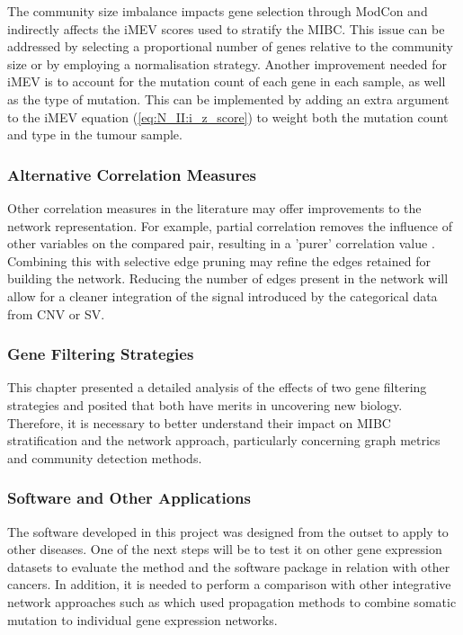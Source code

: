 The community size imbalance impacts gene selection through ModCon and indirectly affects the iMEV scores used to stratify the MIBC. This issue can be addressed by selecting a proportional number of genes relative to the community size or by employing a normalisation strategy. Another improvement needed for iMEV is to account for the mutation count of each gene in each sample, as well as the type of mutation. This can be implemented by adding an extra argument to the iMEV equation (\cref{eq:N_II:i_z_score}) to weight both the mutation count and type in the tumour sample.


\subsubsection*{Alternative Correlation Measures}

Other correlation measures in the literature may offer improvements to the network representation. For example, partial correlation removes the influence of other variables on the compared pair, resulting in a 'purer' correlation value \citep{De_la_Fuente2004-ts}. Combining this with selective edge pruning may refine the edges retained for building the network. Reducing the number of edges present in the network will allow for a cleaner integration of the signal introduced by the categorical data from CNV or SV.

\subsubsection*{Gene Filtering Strategies}

This chapter presented a detailed analysis of the effects of two gene filtering strategies and posited that both have merits in uncovering new biology. Therefore, it is necessary to better understand their impact on MIBC stratification and the network approach, particularly concerning graph metrics and community detection methods. 

\subsubsection*{Software and Other Applications}

The software developed in this project was designed from the outset to apply to other diseases. One of the next steps will be to test it on other gene expression datasets to evaluate the method and the software package in relation with other cancers. In addition, it is needed to perform a comparison with other integrative network approaches such as \citet{Hofree2013-ld,He2017-dj} which used propagation methods to combine somatic mutation to individual gene expression networks.


